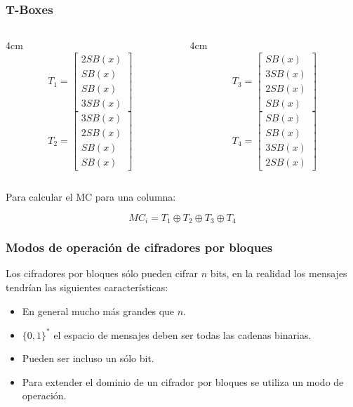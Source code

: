 \documentclass{beamer}
\begin{document}
\frame
{
	\frametitle{T-Boxes}

\begin{columns}
\begin{column}{4cm}
\begin{equation*}
T_1=\begin{bmatrix} 
2SB(x)\\
SB(x)\\
SB(x)\\
3SB(x)
\end{bmatrix}
\end{equation*}
\vspace{0.5cm}
\begin{equation*}
T_2=\begin{bmatrix} 
3SB(x)\\
2SB(x)\\
SB(x)\\
SB(x)
\end{bmatrix}
\end{equation*}
\end{column}
\begin{column}{4cm}	
\begin{equation*}
T_3=\begin{bmatrix} 
SB(x)\\
3SB(x)\\
2SB(x)\\
SB(x)
\end{bmatrix}
\end{equation*}
\vspace{0.5cm}
\begin{equation*}
T_4=\begin{bmatrix} 
SB(x)\\
SB(x)\\
3SB(x)\\
2SB(x)
\end{bmatrix}
\end{equation*}
\end{column}
\end{columns}
	
\vspace{0.5cm}
	{\color{red}Para calcular el MC para una columna:
	
	$$ MC_i = T_1 \oplus T_2 \oplus T_3 \oplus T_4$$
	
	
	}	
	
	
	
}

\frame
{
	\frametitle{Modos de operación de cifradores por bloques}

Los cifradores por bloques sólo pueden cifrar $n$ bits, en la realidad los mensajes tendrían las siguientes características:


\begin{itemize}
\item En general mucho más grandes que $n$.
\item $\{0,1\}^*$ el espacio de mensajes deben ser todas las cadenas binarias.
\item Pueden ser incluso un sólo bit. \pause
\item {\color{red}Para extender el dominio de un cifrador por bloques se utiliza un modo de operación}.
\end{itemize}

}
\end{document}
